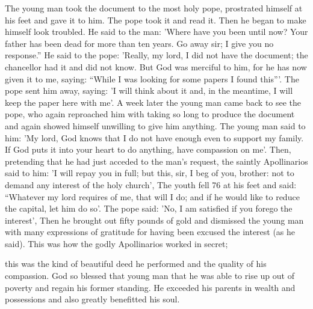 The young man took the document to the most holy pope,
prostrated himself at his feet and gave it to him. The pope took it
and read it. Then he began to make himself look troubled. He said
to the man: 'Where have you been until now? Your father has been
dead for more than ten years. Go away sir; I give you no response.”
He said to the pope: 'Really, my lord, I did not have the document;
the chancellor had it and did not know. But God was merciful to
him, for he has now given it to me, saying: “While I was looking for
some papers I found this”'. The pope sent him away, saying: 'I will
think about it and, in the meantime, I will keep the paper here with
me'. A week later the young man came back to see the pope, who
again reproached him with taking so long to produce the document
and again showed himself unwilling to give him anything. The
young man said to him: 'My lord, God knows that I do not have
enough even to support my family. If God puts it into your heart
to do anything, have compassion on me'. Then, pretending that he
had just acceded to the man's request, the saintly Apollinarios said
to him: 'I will repay you in full; but this, sir, I beg of you, brother:
not to demand any interest of the holy church', The youth fell 76
at his feet and said: “Whatever my lord requires of me, that will I
do; and if he would like to reduce the capital, let him do so'. The
pope said: 'No, I am satisfied if you forego the interest', Then he
brought out fifty pounds of gold and dismissed the young man with
many expressions of gratitude for having been excused the interest
(as he said). This was how the godly Apollinarios worked in secret;

this was the kind of beautiful deed he performed and the quality of
his compassion. God so blessed that young man that he was able to
rise up out of poverty and regain his former standing. He exceeded
his parents in wealth and possessions and also greatly benefitted his
soul.

